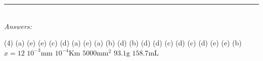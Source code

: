 \documentclass[main.tex]{subfiles}
\begin{document}
\begin{fullwidth}
\par\noindent\rule{0.5\textwidth}{0.4pt}\\
\emph{Answers:}\\
\vspace{0.5cm}
\begin{tasks}[counter-format={tsk[1].}, label-align=left, label-offset={0mm}, label-width={5mm}, item-indent={1mm}, label-format={\bfseries}](4)
\task (a) 
\task (e) 
\task (e) 
\task (c) 
\task (d)
\task (a)
\task (e)
\task (a)
\task (b)
\task (d)
\task (b)
\task (d)
\task (d)
\task (c)
\task (d)
\task (c)
\task (d)
\task (e)
\task (e)
\task (b)
\task $x=12$
\task $10^{-3}\text{mm}$
\task $10^{-4}\text{Km}$
\task \small $5000\text{mm}^2$
\task $93.1\text{g}$
\task \small $158.7\text{mL}$
\end{tasks}






\end{fullwidth}
\restoregeometry
\end{document}
